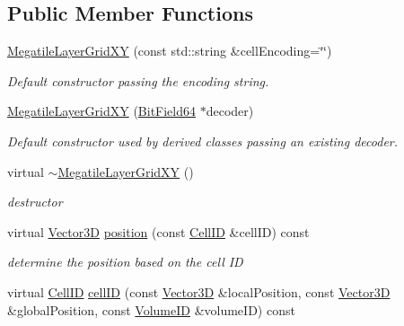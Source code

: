 \subsection*{Public Member Functions}
\begin{DoxyCompactItemize}
\item 
\hyperlink{class_d_d4hep_1_1_d_d_segmentation_1_1_megatile_layer_grid_x_y_a9795d16d3a1423824a95e6b753dc90e8}{MegatileLayerGridXY} (const std::string \&cellEncoding=\char`\"{}\char`\"{})
\begin{DoxyCompactList}\small\item\em Default constructor passing the encoding string. \item\end{DoxyCompactList}\item 
\hyperlink{class_d_d4hep_1_1_d_d_segmentation_1_1_megatile_layer_grid_x_y_ad60883ac07ec3cec93063cab4d79a76d}{MegatileLayerGridXY} (\hyperlink{class_d_d4hep_1_1_d_d_segmentation_1_1_bit_field64}{BitField64} $\ast$decoder)
\begin{DoxyCompactList}\small\item\em Default constructor used by derived classes passing an existing decoder. \item\end{DoxyCompactList}\item 
virtual \hyperlink{class_d_d4hep_1_1_d_d_segmentation_1_1_megatile_layer_grid_x_y_a3ba425f7256a951d0d5b451261023009}{$\sim$MegatileLayerGridXY} ()
\begin{DoxyCompactList}\small\item\em destructor \item\end{DoxyCompactList}\item 
virtual \hyperlink{struct_d_d4hep_1_1_d_d_segmentation_1_1_vector3_d}{Vector3D} \hyperlink{class_d_d4hep_1_1_d_d_segmentation_1_1_megatile_layer_grid_x_y_ab7f4500bd543bd2a837810f130b47539}{position} (const \hyperlink{namespace_d_d4hep_1_1_d_d_segmentation_ac7af071d85cb48820914434a07e21ba1}{CellID} \&cellID) const 
\begin{DoxyCompactList}\small\item\em determine the position based on the cell ID \item\end{DoxyCompactList}\item 
virtual \hyperlink{namespace_d_d4hep_1_1_d_d_segmentation_ac7af071d85cb48820914434a07e21ba1}{CellID} \hyperlink{class_d_d4hep_1_1_d_d_segmentation_1_1_megatile_layer_grid_x_y_abb23df6fd5f38a8324dd3711f0e452bf}{cellID} (const \hyperlink{struct_d_d4hep_1_1_d_d_segmentation_1_1_vector3_d}{Vector3D} \&localPosition, const \hyperlink{struct_d_d4hep_1_1_d_d_segmentation_1_1_vector3_d}{Vector3D} \&globalPosition, const \hyperlink{namespace_d_d4hep_1_1_d_d_segmentation_a61a6833a18d1800bdef176595f83e3ba}{VolumeID} \&volumeID) const 

\end{DoxyCompactItemize}

